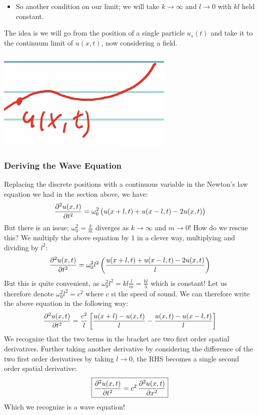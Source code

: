 \begin{itemize}
    \item So another condition on our limit; we will take $k \rightarrow \infty$ and $l \rightarrow 0$ with $kl$ held constant.
\end{itemize}
The idea is we will go from the position of a single particle $u_s(t)$ and take it to the continuum limit of $u(x, t)$, now considering a field.
\begin{center}
    \includegraphics[scale=1]{Lecture-30/l30-img2.png}
\end{center}

\subsubsection{Deriving the Wave Equation}
Replacing the discrete positions with a continuous variable in the Newton's law equation we had in the section above, we have:
\[\dpd[2]{u(x, t)}{t} = \omega_0^2\left(u(x + l, t) + u(x - l, t) - 2u(x, t)\right)\]
But there is an issue; $\omega_0^2 = \frac{k}{m}$ diverges as $k \rightarrow \infty$ and $m \rightarrow 0$! How do we rescue this? We multiply the above equation by $1$ in a clever way, multiplying and dividing by $l^2$:
\[\dpd[2]{u(x, t)}{t} = \omega_0^2l^2\left(\frac{u(x + l, t) + u(x - l, t) - 2u(x, t)}{l}\right)\]
But this is quite convenient, as $\omega_0^2l^2 = kl\frac{l}{m} = \frac{kl}{\lambda}$ which is constant! Let us therefore denote $\omega_0^2l^2 = c^2$ where $c$ si the speed of sound. We can therefore write the above equation in the following way:
\[\dpd[2]{u(x, t)}{t} = \frac{c^2}{l}\left[\frac{u(x +l) - u(x, t)}{l} - \frac{u(x, t) - u(x - l, t)}{l}\right]\]
We recognize that the two terms in the bracket are two first order spatial derivatives. Further taking another derivative by considering the difference of the two first order derivatives by taking $l \rightarrow 0$, the RHS becomes a single second order spatial derivative:
\[\boxed{\dpd[2]{u(x, t)}{t} = c^2\dpd[2]{u(x, t)}{x}}\]
Which we recognize is a wave equation!


